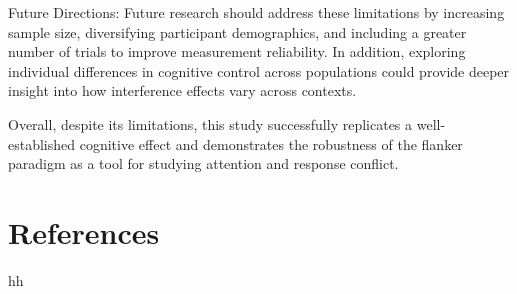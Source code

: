 \documentclass[
  authoryear,
  preprint]{elsarticle}
\begin{document}
Future Directions: Future research should address these limitations by
increasing sample size, diversifying participant demographics, and
including a greater number of trials to improve measurement reliability.
In addition, exploring individual differences in cognitive control
across populations could provide deeper insight into how interference
effects vary across contexts.

Overall, despite its limitations, this study successfully replicates a
well-established cognitive effect and demonstrates the robustness of the
flanker paradigm as a tool for studying attention and response conflict.

\section*{References}\label{references}

hh



\end{document}
